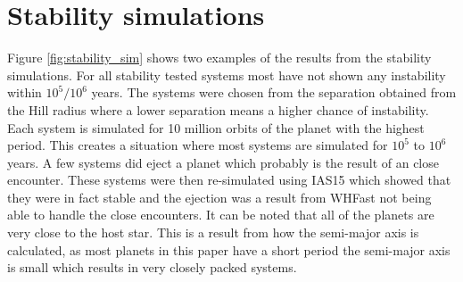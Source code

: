 \documentclass[12pt]{report}
\begin{document}
\section{Stability simulations}
	Figure \ref{fig:stability_sim} shows two examples of the results from the stability simulations. For all stability tested systems most  have not shown any instability within $10^5 / 10^6$ years. The systems were chosen from the separation obtained from the Hill radius where a lower separation means a higher chance of instability. Each system is simulated for 10 million orbits of the planet with the highest period. This creates a situation where most systems are simulated for $10^5$ to $10^6$ years. A few systems did eject a planet which  probably is the result of an close encounter. These systems were then re-simulated using IAS15 which showed that they were in fact stable and the ejection was a result from WHFast not being able to handle the close encounters. It can be noted that all of the planets are very close to the host star. This is a result from how the semi-major axis is calculated, as most planets in this paper have a short period the semi-major axis is small which results in very closely packed systems.
\end{document}
